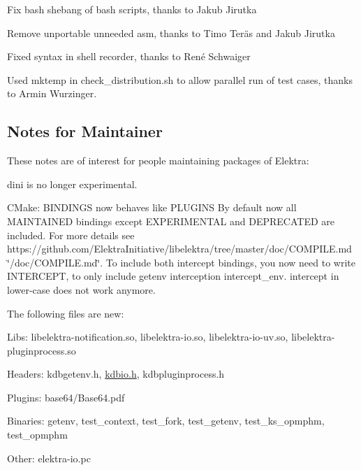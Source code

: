 \begin{DoxyItemize}
\item Fix bash shebang of bash scripts, thanks to Jakub Jirutka
\item Remove unportable unneeded asm, thanks to Timo Teräs and Jakub Jirutka
\item Fixed syntax in shell recorder, thanks to René Schwaiger
\item Used {\ttfamily mktemp} in {\ttfamily check\+\_\+distribution.\+sh} to allow parallel run of test cases, thanks to Armin Wurzinger.
\end{DoxyItemize}

\subsection*{Notes for Maintainer}

These notes are of interest for people maintaining packages of Elektra\+:


\begin{DoxyItemize}
\item {\ttfamily dini} is no longer experimental.
\item C\+Make\+: {\ttfamily B\+I\+N\+D\+I\+N\+GS} now behaves like {\ttfamily P\+L\+U\+G\+I\+NS} By default now all M\+A\+I\+N\+T\+A\+I\+N\+ED bindings except E\+X\+P\+E\+R\+I\+M\+E\+N\+T\+AL and D\+E\+P\+R\+E\+C\+A\+T\+ED are included. For more details see https\+://github.com/\+Elektra\+Initiative/libelektra/tree/master/doc/\+C\+O\+M\+P\+I\+L\+E.\+md \char`\"{}/doc/\+C\+O\+M\+P\+I\+L\+E.\+md\char`\"{}. To include both intercept bindings, you now need to write {\ttfamily I\+N\+T\+E\+R\+C\+E\+PT}, to only include getenv interception {\ttfamily intercept\+\_\+env}. {\ttfamily intercept} in lower-\/case does not work anymore.
\end{DoxyItemize}

The following files are new\+:


\begin{DoxyItemize}
\item Libs\+: {\ttfamily libelektra-\/notification.\+so}, {\ttfamily libelektra-\/io.\+so}, {\ttfamily libelektra-\/io-\/uv.\+so}, {\ttfamily libelektra-\/pluginprocess.\+so}
\item Headers\+: {\ttfamily kdbgetenv.\+h}, {\ttfamily \hyperlink{kdbio_8h}{kdbio.\+h}}, {\ttfamily kdbpluginprocess.\+h}
\item Plugins\+: {\ttfamily base64/\+Base64.\+pdf}
\item Binaries\+: {\ttfamily getenv}, {\ttfamily test\+\_\+context}, {\ttfamily test\+\_\+fork}, {\ttfamily test\+\_\+getenv}, {\ttfamily test\+\_\+ks\+\_\+opmphm}, {\ttfamily test\+\_\+opmphm}
\item Other\+: {\ttfamily elektra-\/io.\+pc}
\end{DoxyItemize}

